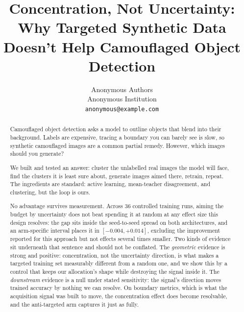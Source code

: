\documentclass{article} %
\title{Concentration, Not Uncertainty: Why Targeted Synthetic Data Doesn't Help Camouflaged Object Detection}
\author{Anonymous Authors \\
Anonymous Institution \\
\texttt{anonymous@example.com}
}
\begin{document}
\maketitle

\begin{abstract}
Camouflaged object detection asks a model to outline objects that blend into their background. Labels are expensive, tracing a boundary you can barely see is slow, so synthetic camouflaged
images are a common partial remedy. However, which images should you generate? 

We built and tested an answer: cluster the unlabelled real images the model will face, find the
clusters it is least sure about, generate images aimed there, retrain, repeat. The ingredients are standard: active learning, mean-teacher disagreement, and clustering, but the loop is ours.

No advantage survives measurement. Across $36$ controlled training runs, aiming the budget by uncertainty does not beat spending it at random at any effect size this design resolves: the gap sits inside the seed-to-seed spread on both architectures, and an arm-specific interval places it in $[-0.004, +0.014]$, excluding the improvement reported for this approach but not effects several times smaller. Two kinds of evidence sit underneath that sentence and should not be conflated. The
\emph{geometric} evidence is strong and positive: concentration, not the uncertainty direction, is what makes a targeted training set measurably different from a random one, and we show this by a control that keeps our allocation's shape while destroying the signal inside it. The
\emph{downstream} evidence is a null under stated sensitivity: the signal's direction moves trained
accuracy by nothing we can resolve. On boundary metrics, which is what the acquisition signal was built to move, the concentration effect does become resolvable, and the anti-targeted arm captures
it just as fully.


\end{abstract}
\end{document}
